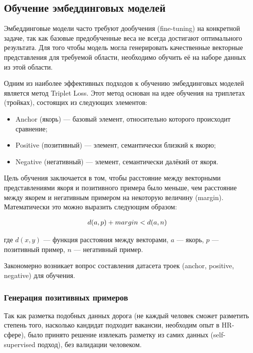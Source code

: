 \documentclass[14pt]{mmcs_article}
\begin{document}
\subsection*{Обучение эмбеддинговых моделей}

Эмбеддинговые модели часто требуют дообучения (fine-tuning) на конкретной задаче, так как базовые предобученные веса не всегда достигают оптимального результата. Для того чтобы модель могла генерировать качественные векторные представления для требуемой области, необходимо обучить её на наборе данных из этой области.

Одним из наиболее эффективных подходов к обучению эмбеддинговых моделей является метод Triplet Loss. Этот метод основан на идее обучения на триплетах (тройках), состоящих из следующих элементов:
\begin{itemize}
  \item Anchor (якорь) --- базовый элемент, относительно которого происходит сравнение;
  \item Positive (позитивный) --- элемент, семантически близкий к якорю;
  \item Negative (негативный) --- элемент, семантически далёкий от якоря.
\end{itemize}

Цель обучения заключается в том, чтобы расстояние между векторными представлениями якоря и позитивного примера было меньше, чем расстояние между якорем и негативным примером на некоторую величину (margin). Математически это можно выразить следующим образом:

\begin{equation*}
  \centering
  \allowdisplaybreaks[1]
  \begin{split}
    d(a,p) + margin < d(a,n)
  \end{split}
\end{equation*}

где $d(x,y)$ --- функция расстояния между векторами, $a$ --- якорь, $p$ --- позитивный пример, $n$ --- негативный пример.

Закономерно возникает вопрос составления датасета троек (anchor, positive, negative) для обучения.

\subsubsection*{Генерация позитивных примеров}\label{positive_examples_generation}

Так как разметка подобных данных дорога (не каждый человек сможет разметить степень того, насколько кандидат подходит вакансии, необходим опыт в HR-сфере), было принято решение извлекать разметку из самих данных (self-supervised подход), без валидации человеком.
\end{document}
